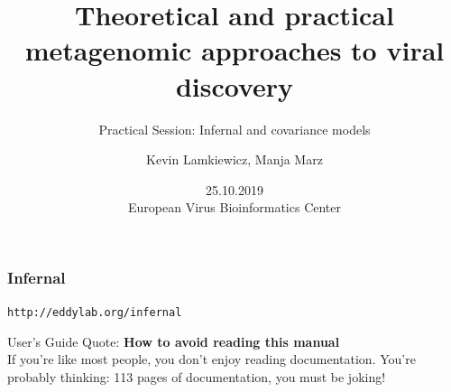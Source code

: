 

\title{Theoretical and practical metagenomic approaches to viral discovery}
\subtitle{Practical Session: Infernal and covariance models}
\author{Kevin Lamkiewicz, Manja Marz}
\date{25.10.2019\\[1em]European Virus Bioinformatics Center}



\begin{frame}
  \maketitle
\end{frame}

\begin{frame}[c, fragile]\frametitle{Infernal}
  \texttt{http://eddylab.org/infernal}
  \begin{block}{User's Guide Quote:}
      \textbf{How to avoid reading this manual}\\
      If you’re like most people, you don’t enjoy reading documentation. You’re probably thinking: 113 pages
      of documentation, you must be joking!
  \end{block}


\end{frame}

